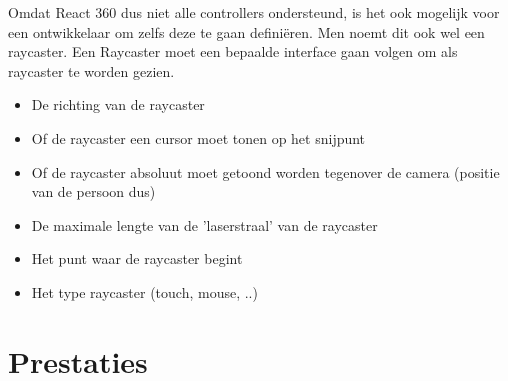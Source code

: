 Omdat React 360 dus niet alle controllers ondersteund, is het ook mogelijk voor een ontwikkelaar om zelfs deze te gaan definiëren. Men noemt dit ook wel een raycaster. Een Raycaster moet een bepaalde interface gaan volgen om als raycaster te worden gezien.

\begin{itemize}
	\item De richting van de raycaster
	\item Of de raycaster een cursor moet tonen op het snijpunt
	\item Of de raycaster absoluut moet getoond worden tegenover de camera (positie van de persoon dus)
	\item De maximale lengte van de 'laserstraal' van de raycaster
	\item Het punt waar de raycaster begint
	\item Het type raycaster (touch, mouse, ..)
\end{itemize}

\section{Prestaties}
\label{sec:prestaties}